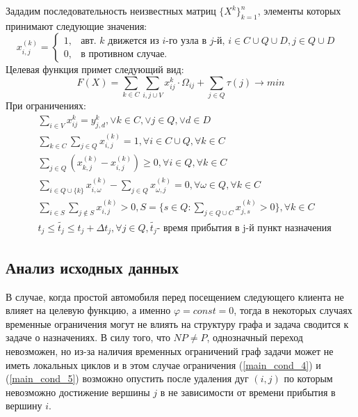 \documentclass[]{TAACpaper}
\begin{document}
Зададим последовательность неизвестных матриц $\{X^k\}^n_{k=1}$, элементы  которых принимают следующие значения:
\begin{equation}
  x^{(k)}_{i,j} = 
    \begin{cases}
	  1,&\text{авт. $k$ движется из $i$-го узла в $j$-й, 
	           $i\in{C}\cup{Q}\cup{D}, j \in Q\cup{D}$ }\\
	  0,&\text{в противном случае.}
    \end{cases}
\end{equation}
Целевая функция примет следующий вид:
\begin{equation} \label{main_objective}
  F(X) = 
    \sum_{k \in C}
     \sum_{i,j\cup{V}} 
     x_{ij}^{k}\cdot\Omega_{ij}+\sum_{j\in{Q}}\tau(j)
     \to min
\end{equation}
При ограничениях:
\begin{align} 
& \sum_{i\in{V}}x_{ij}^{k}=y_{j,d}^{k}, \vee{k}\in{C}, \vee{j}\in{Q},\vee{d}\in{D}\\
& \sum_{k \in C}\sum_{j \in Q}x^{(k)}_{i,j} = 1, 
  \forall i \in C \cup Q, \forall k \in C \label{main_cond_1}\\ 
& \sum_{j \in Q} ( 
       x^{(k)}_{k,j} -x^{(k)}_{i,j} ) \geq 0, 
       \forall i \in Q ,  \forall k \in C \label{main_cond_2}\\
& \sum_{i \in Q \cup  \{k\}} x^{(k)}_{i,\omega} - 
  \sum_{j \in Q} x^{(k)}_{\omega,j} = 0, 
  \forall \omega \in Q ,  \forall k \in C \label{main_cond_3}\\
&  \sum_{i \in S}\sum_{j \notin S}x^{(k)}_{i,j} > 0, 
  S=\{s \in Q: \sum_{j \in Q \cup C}x^{(k)}_{j,s}>0 \}  ,\forall k \in C \label{main_cond_4}\\
& t_j \leq \tilde{t_j} \leq t_j + \Delta t_j, \forall j \in Q, 
\tilde{t_j} \text {- время прибытия в j-й пункт назначения} \label{main_cond_5}
\end{align}

\subsection{Анализ исходных данных}
В случае, когда простой автомобиля перед посещением следующего клиента не влияет на целевую функцию, а именно $\varphi=const=0$, тогда в некоторых случаях временные ограничения могут не влиять на структуру графа и задача сводится к задаче о назначениях. В силу того, что $NP \neq P$, однозначный переход невозможен, но из-за наличия временных ограничений граф задачи может не иметь локальных циклов и в этом случае  ограничения (\ref{main_cond_4}) и (\ref{main_cond_5}) возможно опустить после удаления дуг $(i,j)$ по которым невозможно достижение вершины $j$ в не зависимости от времени прибытия в вершину $i$.
\end{document}
